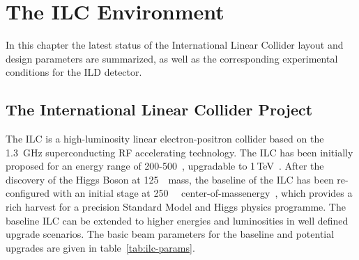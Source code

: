 \chapter{The ILC Environment}
\label{chap:ilc}
\label{ild:sec:ilc}

In this chapter the latest status of the International Linear Collider layout and design parameters are summarized, as well as the corresponding experimental conditions for the ILD detector.

\section{The International Linear Collider Project}
The ILC is a high-luminosity linear electron-positron collider based on the 1.3~GHz superconducting RF accelerating technology. The ILC has been initially proposed for an energy range of 200-500~\GeV, upgradable to 1\,TeV~\cite{Behnke:2013xla}. After the discovery of the Higgs Boson at 125~\GeV~mass, the baseline of the ILC has been re-configured with an initial stage at 250~\GeV~ center-of-massenergy~\cite{Bambade:2019fyw}, which provides a rich harvest for a precision Standard Model and Higgs physics programme. The baseline ILC can be extended to higher energies and luminosities in well defined upgrade scenarios. The basic beam parameters for the baseline and potential upgrades are given in table~\ref{tab:ilc-params}.

